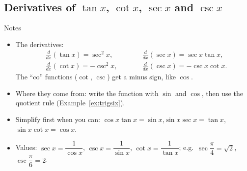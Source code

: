 \documentclass[11pt,a4paper]{article}
\begin{document}
\subsection{\texorpdfstring{Derivatives of $\tan x$, $\cot x$, $\sec x$ and $\csc x$}{Derivatives of tan x, cot x, sec x and csc x}}
\begin{notesbox}{Notes}
\begin{itemize}
 \item The derivatives:
 \[
 \begin{aligned}
 &\frac{d}{dx}(\tan x)=\sec^2x, &\qquad &\frac{d}{dx}(\sec x)=\sec x\tan x,\\[4pt]
 &\frac{d}{dx}(\cot x)=-\csc^2x, &\qquad &\frac{d}{dx}(\csc x)=-\csc x\cot x.
 \end{aligned}
 \]
 The ``co'' functions ($\cot$, $\csc$) get a minus sign, like $\cos$.
 \item Where they come from: write the function with $\sin$ and $\cos$, then use the quotient rule (\mbox{Example~\ref{ex:trigsix}}).
 \item Simplify first when you can: $\cos x\tan x=\sin x$,\quad $\sin x\sec x=\tan x$,\quad $\sin x\cot x=\cos x$.
 \item Values: $\sec x=\dfrac{1}{\cos x}$, $\csc x=\dfrac{1}{\sin x}$, $\cot x=\dfrac{1}{\tan x}$; e.g.\ $\sec\dfrac{\pi}{4}=\sqrt2$, $\csc\dfrac{\pi}{6}=2$.
\end{itemize}
\end{notesbox}
\end{document}
